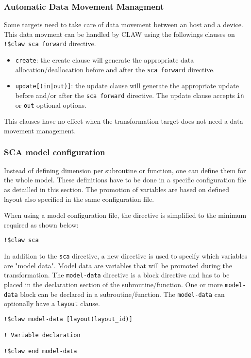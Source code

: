 \subsubsection{Automatic Data Movement Managment}
Some targets need to take care of data movement between an host and a device.
This data movment can be handled by CLAW using the followings clauses on
\lstinline|!$claw sca forward| directive.%

\begin{itemize}
  \item \lstinline|create|: the create clause will generate the appropriate
        data allocation/deallocation before and after the
        \lstinline|sca forward| directive.
  \item \lstinline!update[(in|out)]!: the update clause will generate the
        appropriate update before and/or after the \lstinline|sca forward|
        directive. The update clause accepts \lstinline|in| or \lstinline|out|
        optional options.
\end{itemize}

This clauses have no effect when the transformation target does not need a
data movement management.

\subsubsection{SCA model configuration}
Instead of defining dimension per subroutine or function, one can define them
for the whole model. These definitions have to be done in a specific
configuration file as detailled in this section. The promotion of variables are
based on defined layout also specified in the same configuration file.

When using a model configuration file, the directive is simplified to the
minimum required as shown below:
\begin{lstlisting}
!$claw sca
\end{lstlisting}

In addition to the \lstinline|sca| directive, a new directive is used to specify
which variables are "model data".
Model data are variables that will be promoted during the transformation. The
\lstinline|model-data| directive is a block directive and has to be placed in
the declaration section of the subroutine/function. One or more
\lstinline|model-data| block can be declared in a subroutine/function. The
\lstinline|model-data| can optionally have a \lstinline|layout| clause.

\begin{lstlisting}
!$claw model-data [layout(layout_id)]

! Variable declaration

!$claw end model-data
\end{lstlisting}



